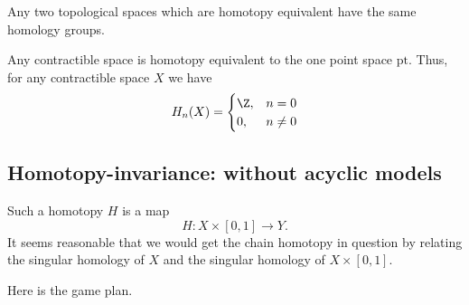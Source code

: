 \documentclass[main.tex]{subfiles}
\begin{document}
\begin{corollary}
  Any two topological spaces which are homotopy equivalent have the same homology groups.
\end{corollary}

\begin{example}
  Any contractible space is homotopy equivalent to the one point space $\mathrm{pt}$. Thus, for any contractible space $X$ we have
  \begin{equation*}
    H_{n}(X) =
    \begin{cases}
      \Z, &n = 0 \\
      0, &n \neq 0
    \end{cases}
  \end{equation*}
\end{example}

\subsection{Homotopy-invariance: without acyclic models}
\label{ssc:homotopy_invariance_without_acyclic_models}


Such a homotopy $H$ is a map
\begin{equation*}
  H\colon X \times [0, 1] \to Y.
\end{equation*}
It seems reasonable that we would get the chain homotopy in question by relating the singular homology of $X$ and the singular homology of $X \times [0, 1]$.

Here is the game plan.
\end{document}
